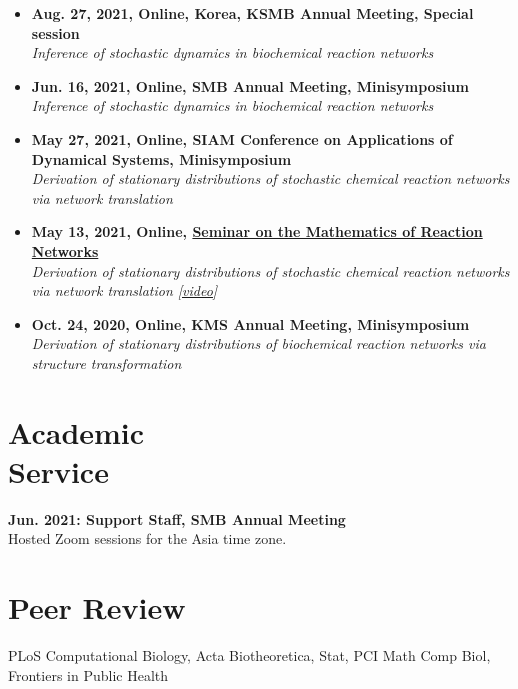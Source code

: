 \documentclass[margin,line]{res}
\newcommand{\vspacesection}{\vspace*{-1.5mm}}
\begin{document}
\begin{resume}
\begin{itemize}[leftmargin=0pt, label={}]
    \item \textbf{Aug. 27, 2021, Online, Korea, KSMB Annual Meeting, Special session} \\
    \textit{Inference of stochastic dynamics in biochemical reaction networks}
    \item \textbf{Jun. 16, 2021, Online, SMB Annual Meeting, Minisymposium} \\
    \textit{Inference of stochastic dynamics in biochemical reaction networks}
    \item \textbf{May 27, 2021, Online, SIAM Conference on Applications of Dynamical Systems, Minisymposium} \\
    \textit{Derivation of stationary distributions of stochastic chemical reaction networks via network translation}
    \item \textbf{May 13, 2021, Online, \href{https://researchseminars.org/seminar/MoRN}{Seminar on the Mathematics of Reaction Networks}} \\
    \textit{Derivation of stationary distributions of stochastic chemical reaction networks via network translation [\href{https://www.youtube.com/watch?v=KC7gRxCBmnc&ab_channel=MathematicsofReactionNetworks}{\ul{video}}]}
    \item \textbf{Oct. 24, 2020, Online, KMS Annual Meeting, Minisymposium} \\
    \textit{Derivation of stationary distributions of biochemical reaction networks via structure transformation}
\end{itemize}
\vspacesection
\section{\sc Academic \\ Service}
\textbf{Jun. 2021: Support Staff, SMB Annual Meeting} \\
Hosted Zoom sessions for the Asia time zone.
\vspace{-5pt}

\section{\sc Peer Review}
PLoS Computational Biology, Acta Biotheoretica, Stat, PCI Math Comp Biol, Frontiers in Public Health
\vspace{-8pt}


\end{resume}
\end{document}
